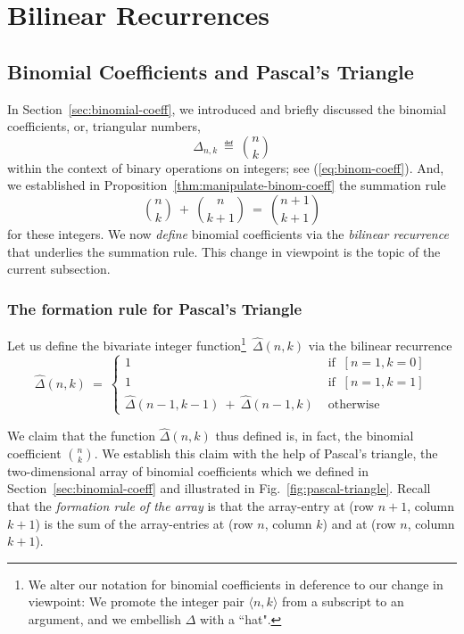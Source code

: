 \section{Bilinear Recurrences}
\label{sec:bilinear-recurrences}

\subsection{Binomial Coefficients and Pascal's Triangle}
\label{sec:binomial-coeff+Pascal}

 
In Section~\ref{sec:binomial-coeff}, we introduced and briefly discussed the binomial coefficients, or, triangular numbers, 
\[ \Delta_{n,k} \ \eqdef \ {n \choose k} \]
within the context of binary operations on integers; see (\ref{eq:binom-coeff}).  And, we established in Proposition~\ref{thm:manipulate-binom-coeff} the summation rule
\[
{n \choose k} \ + \ {n \choose {k+1}} \ = \ {{n+1} \choose {k+1}}
\]
for these integers.  We now {\em define} binomial coefficients via the {\em bilinear recurrence} that underlies the summation rule.  This change in viewpoint is the topic of the current subsection.

\subsubsection{The formation rule for Pascal's Triangle}
\label{sec:Pascal-formation}

Let us define the bivariate integer function\footnote{We alter our notation for binomial coefficients in deference to our change in viewpoint: We promote the integer pair $\langle n,k \rangle$ from a subscript to an argument, and we embellish $\Delta$ with a ``hat".}~$\hat{\Delta}(n,k)$ via the bilinear recurrence
\begin{equation}
\label{eq:binom-coeff-recurrence}
\hat{\Delta}(n,k) \ = \ 
\left\{
\begin{array}{cl}
1  & \mbox{ if } \ [n=1, k=0] \\
1  & \mbox{ if } \ [n=1, k=1] \\
\hat{\Delta}(n-1, k-1) \ + \  \hat{\Delta}(n-1,k) & \mbox{ otherwise}
\end{array}
\right.
\end{equation}

\smallskip

We claim that the function $\hat{\Delta}(n,k)$ thus defined is, in fact, the binomial coefficient $\displaystyle {n \choose k}$.  We establish this claim with the help of Pascal's triangle, the two-dimensional array of binomial coefficients which we defined in Section~\ref{sec:binomial-coeff} and illustrated in Fig.~\ref{fig:pascal-triangle}.  Recall that the {\em formation rule of the array} is that the array-entry at (row $n+1$, column $k+1$) is the sum of the array-entries at (row $n$, column $k$) and at (row $n$, column $k+1$).

